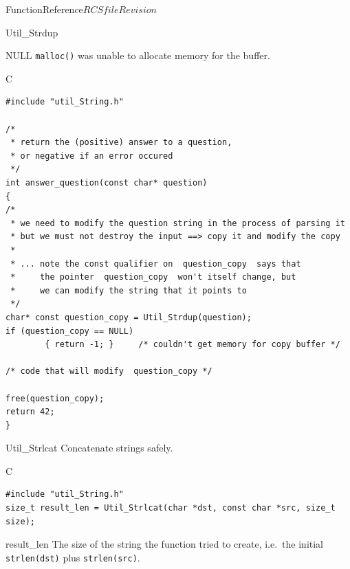 \begin{cactuspart}{FunctionReference}{$RCSfile$}{$Revision$}
\begin{FunctionDescription}{Util\_Strdup}
\begin{ErrorSection}
\begin{Error}{NULL}
\verb|malloc()| was unable to allocate memory for the buffer.
\end{Error}
\end{ErrorSection}

\begin{ExampleSection}
\begin{Example}{C}
\begin{verbatim}
#include "util_String.h"

/*
 * return the (positive) answer to a question,
 * or negative if an error occured
 */
int answer_question(const char* question)
{
/*
 * we need to modify the question string in the process of parsing it
 * but we must not destroy the input ==> copy it and modify the copy
 *
 * ... note the const qualifier on  question_copy  says that
 *     the pointer  question_copy  won't itself change, but
 *     we can modify the string that it points to
 */
char* const question_copy = Util_Strdup(question);
if (question_copy == NULL)
        { return -1; }     /* couldn't get memory for copy buffer */

/* code that will modify  question_copy */

free(question_copy);
return 42;
}
\end{verbatim}
\end{Example}
\end{ExampleSection}
\end{FunctionDescription}


\begin{FunctionDescription}{Util\_Strlcat}
\label{Util-Strlcat}
Concatenate strings safely.

\begin{SynopsisSection}
\begin{Synopsis}{C}
\begin{verbatim}
#include "util_String.h"
size_t result_len = Util_Strlcat(char *dst, const char *src, size_t size);
\end{verbatim}
\end{Synopsis}
\end{SynopsisSection}

\begin{ResultSection}
\begin{Result}{result\_len}
The size of the string the function tried to create, i.e.\
the initial \verb|strlen(dst)| plus \verb|strlen(src)|.
\end{Result}
\end{ResultSection}


\end{FunctionDescription}
\end{cactuspart}
